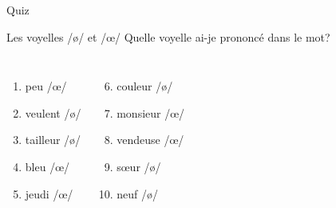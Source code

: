 \documentclass{beamer}
\begin{document}
  \begin{frame}{}
    \begin{center}
      \Large Quiz
    \end{center}
  \end{frame}

  \begin{frame}{Les voyelles /ø/ et /œ/}
    Quelle voyelle ai-je prononcé dans le mot?
    \begin{columns}
        \begin{enumerate}
          \item peu  /œ/
          \item veulent /ø/ 
          \item tailleur /ø/ 
          \item bleu  /œ/
          \item jeudi  /œ/
        \end{enumerate}
        \begin{enumerate}
          \setcounter{enumi}{5}
          \item couleur /ø/ 
          \item monsieur  /œ/
          \item vendeuse  /œ/
          \item sœur /ø/ 
          \item neuf /ø/ 
        \end{enumerate}
    \end{columns}
  \end{frame}
\end{document}
